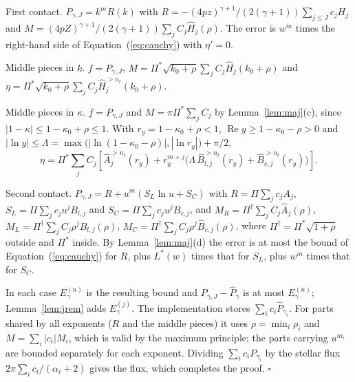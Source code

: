 \documentclass[11pt]{article}
\begin{document}
First contact. $P_{\gamma,J}=k^{m}R(k)$ with $R=-(4pz)^{\gamma+1}/(2(\gamma+1))\sum_{j\le J}c_jH_j$ and $M=(4pZ)^{\gamma+1}/(2(\gamma+1))\sum_jC_j\hat H_j(\rho)$. The error is $w^m$ times the right-hand side of Equation~(\ref{eq:cauchy}) with $\eta'=0$.

Middle pieces in $k$. $f=P_{\gamma,J}$, $M=\Pi^*\sqrt{k_0+\rho}\sum_jC_j\hat H_j(k_0+\rho)$ and $\eta=\Pi^*\sqrt{k_0+\rho}\sum_jC_j\hat H_j^{>n_t}(k_0+\rho)$.

Middle pieces in $\kappa$. $f=P_{\gamma,J}$ and $M=\pi\Pi^*\sum_jC_j$ by Lemma~\ref{lem:maj}(c), since $|1-\kappa|\le1-\kappa_0+\rho\le1$. With $r_y=1-\kappa_0+\rho<1$, $\operatorname{Re}y\ge1-\kappa_0-\rho>0$ and $|\ln y|\le\Lambda=\max\bigl(|\ln(1-\kappa_0-\rho)|,|\ln r_y|\bigr)+\pi/2$,
\begin{equation}
\eta=\Pi^*\sum_jC_j\left[\hat A_j^{>n_t}(r_y)+r_y^{m+j}\bigl(\Lambda\,\hat B_{l,j}^{>n_t}(r_y)+\hat B_{c,j}^{>n_t}(r_y)\bigr)\right]. \label{eq:Eneta}
\end{equation}

Second contact. $P_{\gamma,J}=R+u^{m}(S_L\ln u+S_C)$ with $R=\Pi\sum_jc_jA_j$, $S_L=\Pi\sum_jc_ju^jB_{l,j}$ and $S_C=\Pi\sum_jc_ju^jB_{c,j}$, and $M_R=\Pi^\dagger\sum_jC_j\hat A_j(\rho)$, $M_L=\Pi^\dagger\sum_jC_j\rho^j\hat B_{l,j}(\rho)$, $M_C=\Pi^\dagger\sum_jC_j\rho^j\hat B_{c,j}(\rho)$, where $\Pi^\dagger=\Pi^*\sqrt{1+\rho}$ outside and $\Pi^*$ inside. By Lemma~\ref{lem:maj}(d) the error is at most the bound of Equation~(\ref{eq:cauchy}) for $R$, plus $L^*(w)$ times that for $S_L$, plus $w^m$ times that for $S_C$.

In each case $E^{(n)}_\gamma$ is the resulting bound and $P_{\gamma,J}-\hat P_\gamma$ is at most $E^{(n)}_\gamma$; Lemma~\ref{lem:jrem} adds $E^{(j)}_\gamma$. The implementation stores $\sum_ic_i\hat P_{\gamma_i}$. For parts shared by all exponents ($R$ and the middle pieces) it uses $\rho=\min_i\rho_i$ and $M=\sum_i|c_i|M_i$, which is valid by the maximum principle; the parts carrying $u^{m_i}$ are bounded separately for each exponent. Dividing $\sum_ic_iP_{\gamma_i}$ by the stellar flux $2\pi\sum_ic_i/(\alpha_i+2)$ gives the flux, which completes the proof. \hfill$\square$





\end{document}

